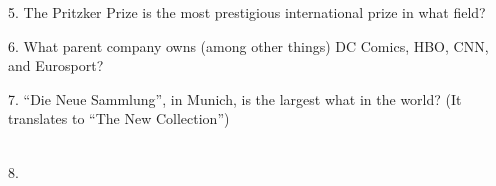 \begin{frame}
\begin{center}
\Large
5. The Pritzker Prize is the most prestigious international prize in what field?
\\
\end{center}
\end{frame}
\begin{frame}
\begin{center}
\Large
6. What parent company owns (among other things) DC Comics, HBO, CNN, and Eurosport?
\\
\end{center}
\end{frame}
\begin{frame}
\begin{center}
\Large
7. ``Die Neue Sammlung'', in Munich, is the largest what in the world? (It translates to ``The New Collection'')
\\
\\
\end{center}
\end{frame}
\begin{frame}
\begin{center}
\Large
8. 
\end{center}
\end{frame}
